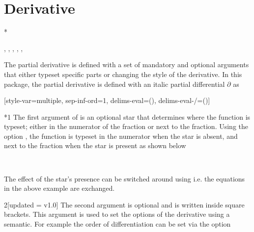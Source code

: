 	
	
	\clearpage
	\section{Derivative}
	
	\begin{function}*{\pdv}
		\begin{syntax}
			\sarg, , , \targ{/}, , 
		\end{syntax}
		The partial derivative  is defined with a set of mandatory and optional arguments that either typeset specific parts or changing the style of the derivative. In this package, the partial derivative is defined with an italic partial differential $\partial$ as
		
		\begin{definition}
			\DeclareDerivative{\pdv}{\partial}[style-var=multiple, sep-inf-ord=1,%
			delims-eval=(), delims-eval-/=()]
		\end{definition}
		
		\begin{argument}*{1}
			The first argument of  is an optional star that determines where the function is typeset; either in the numerator of the fraction or next to the fraction. Using the option , the function is typeset in the numerator when the star is absent, and next to the fraction when the star is present as shown below
			
			\begin{example}
				 \\
			\end{example}
			
			\noindent The effect of the star's presence can be switched around using  i.e. the equations in the above example are exchanged.
		\end{argument}
		
		\begin{argument}{2}[updated = v1.0]
			The second argument is optional and is written inside square brackets. This argument is used to set the options of the derivative using a  semantic. For example the order of differentiation can be set via the \key[cat=misc]{order} option
			
			\begin{example}
				\pdv[order={2,3}]{f}{x,y} \\
				\pdv[order={\beta,a,n+2a}]{f}{x,y,z} \\
				\pdv[order={2,n^2,n^2-1}]{f}{x,y,z} \\
				\pdv[order={2,n^2}]{f}{x,y,z}
			\end{example}
			

\end{argument}
\end{function}
